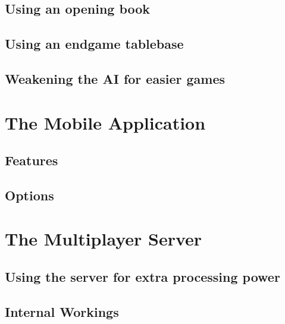 \documentclass[12pt]{report}
\begin{document}
\section{Using an opening book}

\section{Using an endgame tablebase}

\section{Weakening the AI for easier games}


\chapter{The Mobile Application}

\section{Features}

\section{Options}

\chapter{The Multiplayer Server}

\section{Using the server for extra processing power}

\section{Internal Workings}
\end{document}
